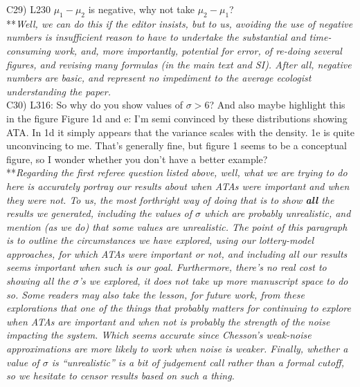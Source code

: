 \documentclass[letterpaper,11pt]{article}
\begin{document}
\noindent C29) L230 $\mu_1-\mu_2$ is negative, why not take $\mu_2-\mu_1$? \\

\noindent ***\emph{Well, we can do this if the editor insists, but to us, avoiding the use of
negative numbers is insufficient reason to have to undertake the substantial and time-consuming 
work, and, more importantly, potential for error, 
of re-doing several figures, and revising many formulas (in the main text and SI).
After all, negative numbers are basic, and represent no impediment to the average ecologist understanding the 
paper. } \\

\noindent C30) L316: So why do you show values of $\sigma >6$? And also maybe highlight this in the figure Figure 1d and e: I’m semi convinced by these distributions showing ATA. In 1d it simply appears that the variance scales with the density. 1e is quite unconvincing to me. That’s generally fine, but figure 1 seems to be a conceptual figure, so I wonder whether you don’t have a better example? \\

\noindent ***\emph{Regarding the first referee question listed above, well, what we are 
trying to do here is accurately portray our results about
when ATAs were important and when they were not. To us, the most forthright way of doing that is to
show \textbf{all} the results we generated, including the values of $\sigma$ which are probably unrealistic, and mention
(as we do) that some values are unrealistic. The point of this paragraph is to outline the circumstances
we have explored, using our lottery-model approaches, for which ATAs were important or not, and including all
our results seems important when such is our goal. Furthermore, there's no real cost to showing
all the $\sigma$'s we explored, it does not take up more manuscript space to do so.
Some readers may also take the lesson, for future work, from these explorations that one of the things that probably 
matters for continuing to explore when ATAs are important and when not is probably the strength
of the noise impacting the system. Which seems accurate since Chesson's weak-noise approximations are more likely
to work when noise is weaker. Finally, whether a value of $\sigma$ is ``unrealistic'' is 
a bit of judgement call rather than a formal cutoff, so we hesitate to censor results 
based on such a thing.}
\end{document}

